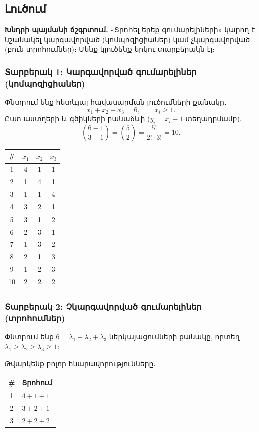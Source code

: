 \documentclass[12pt, a4paper]{article}
\begin{document}
\subsection*{Լուծում}

\textbf{Խնդրի պայմանի ճշգրտում.}\; «Տրոհել երեք գումարելիների» կարող է նշանակել կարգավորված (կոմպոզիցիաներ) կամ չկարգավորված (բուն տրոհումներ)։ Մենք կլուծենք երկու տարբերակն էլ։

\subsubsection*{Տարբերակ 1: Կարգավորված գումարելիներ (կոմպոզիցիաներ)}

Փնտրում ենք հետևյալ հավասարման լուծումների քանակը․
\[
  x_1 + x_2 + x_3 = 6, \qquad x_i \ge 1.
\]
Ըստ աստղերի և գծիկների բանաձևի ($y_i = x_i - 1$ տեղադրմամբ)․
\[
  \binom{6-1}{3-1} = \binom{5}{2} = \frac{5!}{2!\cdot 3!} = 10.
\]

\begin{center}
\renewcommand{\arraystretch}{1.15}
\begin{tabular}{cccc}
\toprule
\textbf{\#} & $x_1$ & $x_2$ & $x_3$ \\
\midrule
1  & 4 & 1 & 1 \\
2  & 1 & 4 & 1 \\
3  & 1 & 1 & 4 \\
4  & 3 & 2 & 1 \\
5  & 3 & 1 & 2 \\
6  & 2 & 3 & 1 \\
7  & 1 & 3 & 2 \\
8  & 2 & 1 & 3 \\
9  & 1 & 2 & 3 \\
10 & 2 & 2 & 2 \\
\bottomrule
\end{tabular}
\end{center}

\subsubsection*{Տարբերակ 2: Չկարգավորված գումարելիներ (տրոհումներ)}

Փնտրում ենք $6 = \lambda_1 + \lambda_2 + \lambda_3$ ներկայացումների քանակը,
որտեղ $\lambda_1 \ge \lambda_2 \ge \lambda_3 \ge 1$։

Թվարկենք բոլոր հնարավորությունները․
\begin{center}
\renewcommand{\arraystretch}{1.15}
\begin{tabular}{cl}
\toprule
\textbf{\#} & \textbf{Տրոհում} \\
\midrule
1 & $4 + 1 + 1$ \\
2 & $3 + 2 + 1$ \\
3 & $2 + 2 + 2$ \\
\bottomrule
\end{tabular}
\end{center}
\end{document}
